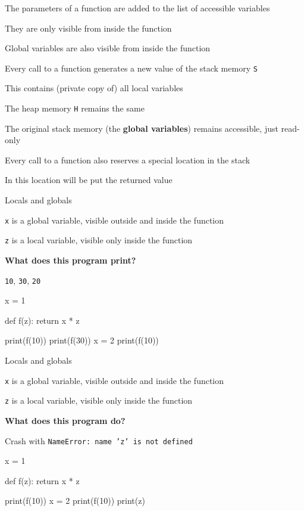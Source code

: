 \documentclass{beamer}
\begin{document}
\begin{slide}{
\item The parameters of a function are added to the list of accessible variables
\item They are only visible from inside the function
\item Global variables are also visible from inside the function
}\end{slide}

\begin{slide}{
\item Every call to a function generates a new value of the stack memory \texttt{S}
\item This contains (private copy of) all local variables
\item The heap memory \texttt{H} remains the same
\item The original stack memory (the \textbf{global variables}) remains accessible, just read-only 
}\end{slide}

\begin{slide}{
\item Every call to a function also reserves a special location in the stack
\item In this location will be put the returned value
}\end{slide}

\begin{frame}[fragile]{Locals and globals}
\begin{codewithblock}{\item \texttt{x} is a global variable, visible outside and inside the function \item \texttt{z} is a local variable, visible only inside the function \pause \item \textbf{What does this program print?} \pause \item \texttt{10}, \texttt{30}, \texttt{20}}
x = 1

def f(z):
  return x * z

print(f(10))
print(f(30))
x = 2
print(f(10))
\end{codewithblock}
\end{frame}

\begin{frame}[fragile]{Locals and globals}
\begin{codewithblock}{\item \texttt{x} is a global variable, visible outside and inside the function \item \texttt{z} is a local variable, visible only inside the function \pause \item \textbf{What does this program do?} \pause \item Crash with \texttt{NameError: name 'z' is not defined}}
x = 1

def f(z):
  return x * z

print(f(10))
x = 2
print(f(10))
print(z)
\end{codewithblock}
\end{frame}
\end{document}
